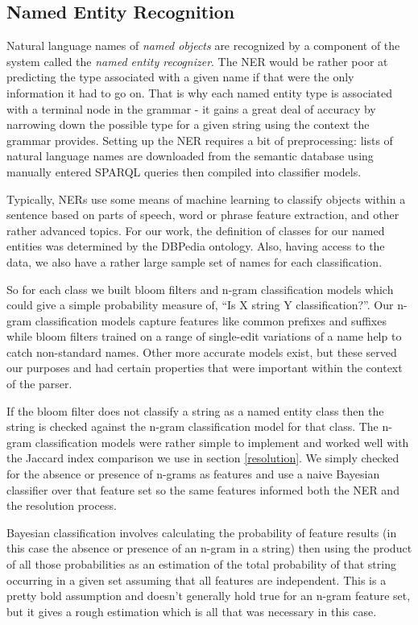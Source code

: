 \documentclass[11pt]{article}
\begin{document}
{\subsection{Named Entity Recognition}
\label{ner}
Natural language names of {\em named objects} are recognized by a component of the system
called the {\em named entity recognizer}\cite{ner1,ner2}. 
The NER would be rather poor at predicting the type associated with a given name if that
were the only information it had to go on. That is why each named entity type is associated
with a terminal node in the grammar - it gains a great deal of accuracy by narrowing down
the possible type for a given string using the context the grammar provides.
Setting up the NER requires a bit of preprocessing:
lists of natural language names are downloaded from the semantic database using
manually entered SPARQL queries then compiled into classifier models.

Typically, NERs use some means of machine learning to classify objects within a
sentence based on parts of speech, word or phrase feature extraction, and other
rather advanced topics\cite{ner1}. 
For our work, the definition of classes for our named entities was determined by the
DBPedia ontology. Also, having access to the data, we also have a rather large sample
set of names for each classification.

So for each class we built bloom filters\cite{bloom} and n-gram classification models 
which could give a simple probability measure of, ``Is X string Y classification?''. 
Our n-gram classification models capture features like common prefixes and suffixes
while bloom filters trained on a range of single-edit variations of a name help
to catch non-standard names. Other more accurate models exist, but these served
our purposes and had certain properties that were important within the context
of the parser.

If the bloom filter does not classify a string as a named entity class then the
string is checked against the n-gram classification model for that class.
The n-gram classification models were rather simple to implement and worked well 
with the Jaccard index comparison we use in section \ref{resolution}. We simply
checked for the absence or presence of n-grams as features and use a naive
Bayesian classifier over that feature set\cite{bayes} so the same features
informed both the NER and the resolution process.

Bayesian classification involves calculating the probability of feature results
(in this case the absence or presence of an n-gram in a string) then using the product
of all those probabilities as an estimation of the total probability of that string
occurring in a given set assuming that all features are independent. This is a
pretty bold assumption and doesn't generally hold true for an n-gram feature set,
but it gives a rough estimation which is all that was necessary in this case.

}
\end{document}
